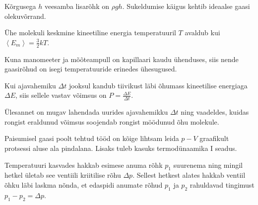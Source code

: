 \documentclass[10pt, twoside]{article}
\begin{document}
{
\hint
Kõrgusega $h$ veesamba lisarõhk on $\rho gh$. Sukeldumise käigus kehtib ideaalse gaasi olekuvõrrand.
\probend
\bigskip


\hint
Ühe molekuli keskmine kineetiline energia temperatuuril $T$ avaldub kui $\left\langle E_{m}\right\rangle=\frac{3}{2} k T$.
\probend
\bigskip


\hint
Kuna manomeeter ja mõõteampull on kapillaari kaudu ühenduses, siis nende gaasirõhud on isegi temperatuuride erinedes ühesugused.
\probend
\bigskip


\hint
Kui ajavahemiku $\Delta t$ jooksul kandub tiivikust läbi õhumass kineetilise energiaga $\Delta E$, siis sellele vastav võimsus on $P = \frac{\Delta E}{\Delta t}$.
\probend
\bigskip


\hint
Ülesannet on mugav lahendada uurides ajavahemikku $\Delta t$ ning vaadeldes, kuidas rongist eraldunud võimsus soojendab rongist möödunud õhu molekule.
\probend
\bigskip


\hint
Paisumisel gaasi poolt tehtud tööd on kõige lihtsam leida $p-V$ graafikult protsessi aluse ala pindalana. Lisaks tuleb kasuks termodünaamika I seadus.
\probend
\bigskip


\hint
Temperatuuri kasvades hakkab esimese anuma rõhk $p_1$ suurenema ning mingil hetkel ületab see ventiili kriitilise rõhu $\Delta p$. Sellest hetkest alates hakkab ventiil õhku läbi laskma nõnda, et edaspidi anumate rõhud $p_1$ ja $p_2$ rahuldavad tingimust $p_1 - p_2 = \Delta p$.
\probend
\bigskip

}
\end{document}
